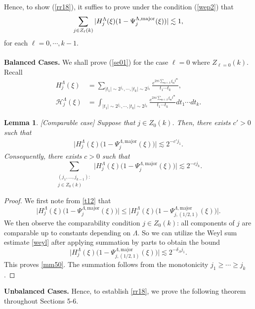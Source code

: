 \documentclass[11 pt,letterpaper]{amsart}
\theoremstyle{plain}
\newtheorem{lemma}{Lemma}\numberwithin{lemma}{section}
\theoremstyle{definition}
\theoremstyle{remark} \theoremstyle{exam} \theoremstyle{ob}
\numberwithin{equation}{section}
\begin{document}
Hence, to show (\ref{rr18}), it suffies to prove  under the  condition (\ref{wep2}) that  
\begin{align}\label{se01}
	\sum_{ j \in Z_{\ell}(k) } |H_j^{\Lambda}(\xi)(1-\Psi^{\Lambda,\rm{major}}_{j}(\xi))| \lesssim 1,
\end{align}
 for each $\ell=0,\cdots,k-1$.\\\\
\textbf{Balanced Cases.}
We  shall  prove (\ref{se01}) for the case $\ell=0$ where $  Z_{\ell=0}(k)$.  Recall
\begin{align*}
	H^{\Lambda}_j(\xi) &=\sum_{|t_1|\sim 2^{j_1},\cdots,|t_k|\sim 2^{j_k}} \frac{e^{2\pi i \sum_{\mathfrak{m}\in \Lambda} \xi_{\mathfrak{m}}t^{\mathfrak{m}} }}{t_1\cdots t_k},\\
	\mathcal{H}^{\Lambda}_j(\xi) &=\int_{|t_1|\sim 2^{j_1},\cdots,|t_k|\sim 2^{j_k}} \frac{e^{2\pi i \sum_{\mathfrak{m}\in \Lambda} \xi_{\mathfrak{m}}t^{\mathfrak{m}} }}{t_1\cdots t_k}dt_1\cdots dt_k.
\end{align*}
\begin{lemma}\label{lemm31}[Comparable case]
Suppose that $j \in Z_0(k)$.
Then, there exists $c'>0$ such that
\begin{align}\label{mm50}
    \bigl| H^{\Lambda}_j(\xi)\bigl(1 - \Psi^{\Lambda,\mathrm{major}}_j(\xi)\bigr) \bigr|
    \lesssim 2^{-c' j_1}.
\end{align}
Consequently, there exists $c>0$ such that 
\[
\sum_{\substack{(j_1,\dots,j_{k-1}): \\ j \in Z_0(k)}}
\bigl| H^{\Lambda}_j(\xi)\bigl(1 - \Psi^{\Lambda,\mathrm{major}}_j(\xi)\bigr) \bigr|
\lesssim 2^{-c j_k}.
\]
\end{lemma}

\begin{proof}
We first note from \eqref{t12} that
\[
\bigl| H^{\Lambda}_j(\xi)\bigl(1 - \Psi^{\Lambda,\mathrm{major}}_j(\xi)\bigr) \bigr|
\le
\bigl| H^{\Lambda}_j(\xi)\bigl(1 - \Psi^{\Lambda,\mathrm{major}}_{j,(1/2,1)}(\xi)\bigr) \bigr|.
\]
We then observe the comparability condition $j \in Z_0(k)$:   all components of $j$ are comparable up to constants depending on $\Lambda$. So we can utilize the Weyl sum estimate \eqref{weyl} after applying summation by parts  to obtain the bound
\[
\bigl| H^{\Lambda}_j(\xi)\bigl(1 - \Psi^{\Lambda,\mathrm{major}}_{j,(1/2,1)}(\xi)\bigr) \bigr|
\lesssim 2^{-\delta_{\Lambda} j_1}.
\]
This proves \eqref{mm50}. The  summation  follows  from the monotonicity $j_1 \ge \cdots \ge j_k$.
\end{proof}
\noindent\textbf{Unbalanced Cases.} Hence, to establish \eqref{rr18}, we prove the following  theorem throughout Sections 5-6.
\end{document}
